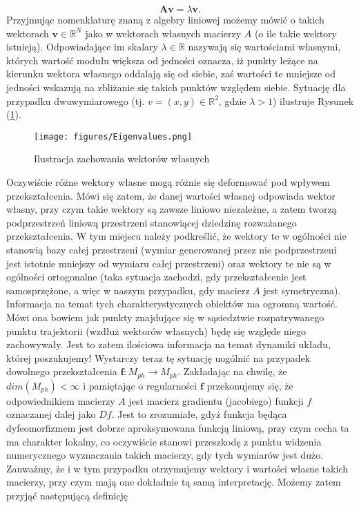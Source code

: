 \documentclass[12pt]{article}
\begin{document}
\begin{equation}
	\textbf{A}\textbf{v} = \lambda \textbf{v}.
\end{equation}
Przyjmując nomenklaturę znaną z algebry liniowej możemy mówić o takich wektorach $ \textbf{v} \in \mathbb{R}^{N} $ jako w wektorach własnych macierzy $ A $ (o ile takie wektory istnieją). Odpowiadające im skalary $ \lambda \in \mathbb{R} $ nazywają się wartościami własnymi, których wartość modułu większa od jedności oznacza, iż punkty leżące na kierunku wektora własnego oddalają się od siebie, zaś wartości te mniejsze od jedności wskazują na zbliżanie się takich punktów względem siebie. Sytuację dla przypadku dwuwymiarowego (tj. $ v = (x,y) \in \mathbb{R}^2 $, gdzie $ \lambda > 1 $) ilustruje Rysunek (\ref{Fig13}).
\begin{figure}[H]
	\texttt{[image: figures/Eigenvalues.png]} 
	\centering
	\caption{Ilustracja zachowania wektorów własnych}
	\label{Fig13}
\end{figure}
Oczywiście różne wektory własne mogą różnie się deformować pod wpływem przekształcenia. Mówi się zatem, że danej wartości własnej odpowiada wektor własny, przy czym takie wektory są zawsze liniowo niezależne, a zatem tworzą podprzestrzeń liniową przestrzeni stanowiącej dziedzinę rozważanego przekształcenia. W tym miejscu należy podkreślić, że wektory te w ogólności nie stanowią bazy całej przestrzeni (wymiar generowanej przez nie podprzestrzeni jest istotnie mniejszy od wymiaru całej przestrzeni) oraz wektory te nie są w   ogólności ortogonalne (taka sytuacja zachodzi, gdy przekształcenie jest samosprzężone, a więc w naszym przypadku, gdy macierz $ A $ jest symetryczna). \newline
Informacja na temat tych charakterystycznych obiektów ma ogromną wartość. Mówi ona bowiem jak punkty znajdujące się w sąsiedztwie rozpatrywanego punktu trajektorii (wzdłuż wektorów własnych) będę się względe niego zachowywały. Jest to zatem ilościowa informacja na temat dynamiki układu, której poszukujemy! Wystarczy teraz tę sytuację uogólnić na przypadek dowolnego przekształcenia $ \textbf{f}: M_{ph} \rightarrow M_{ph}$. Zakładając na chwilę, że $ dim(M_{ph}) < \infty $ i pamiętając o regularności $ \textbf{f} $ przekonujemy się, że odpowiednikiem macierzy $ A $ jest macierz gradientu (jacobiego) funkcji $ f $ oznaczanej dalej jako $ Df $. Jest to zrozumiałe, gdyż funkcja będąca dyfeomorfizmem jest dobrze aproksymowana funkcją liniową, przy czym cecha ta ma charakter lokalny, co oczywiście stanowi przeszkodę z punktu widzenia numerycznego wyznaczania takich macierzy, gdy tych wymiarów jest dużo. Zauważmy, że i w tym przypadku otrzymujemy wektory i wartości własne takich macierzy, przy czym mają one dokładnie tą samą interpretację. Możemy zatem przyjąć następującą definicję
\end{document}
